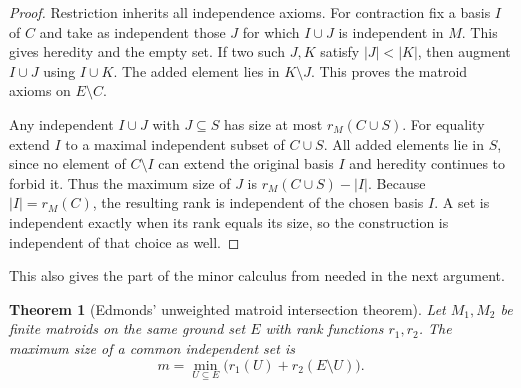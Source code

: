 \documentclass[11pt,oneside,openany]{book}
\theoremstyle{plain}
\newtheorem{theorem}{Theorem}[chapter]
\theoremstyle{definition}
\theoremstyle{remark}
\begin{document}
\begin{proof}
Restriction inherits all independence axioms. For contraction
fix a basis \(I\) of \(C\) and take as independent those \(J\)
for which \(I\cup J\) is independent in \(M\).
This gives heredity and the empty set. If two such \(J,K\)
satisfy \(|J|<|K|\), then augment \(I\cup J\) using \(I\cup K\).
The added element lies in \(K\setminus J\). This proves the
matroid axioms on \(E\setminus C\).

Any independent \(I\cup J\) with \(J\subseteq S\) has size at
most \(r_M(C\cup S)\). For equality extend \(I\) to a maximal
independent subset of \(C\cup S\). All added elements lie in
\(S\), since no element of \(C\setminus I\) can extend the
original basis \(I\) and heredity continues to forbid it.
Thus the maximum size of \(J\) is \(r_M(C\cup S)-|I|\).
Because \(|I|=r_M(C)\), the resulting rank is independent of
the chosen basis \(I\). A set is independent exactly when its
rank equals its size, so the construction is independent of
that choice as well.
\end{proof}

This also gives the part of the minor calculus from
\cite[Chapter~10, W69]{p204} needed in the next argument.

\begin{theorem}[Edmonds' unweighted matroid intersection theorem]
\label{p205:W49}
Let \(M_1,M_2\) be finite matroids on the same ground set \(E\)
with rank functions \(r_1,r_2\). The maximum size of a common
independent set is
\[
 m=\min_{U\subseteq E}\bigl(r_1(U)+r_2(E\setminus U)\bigr).
\]
\end{theorem}
\end{document}
